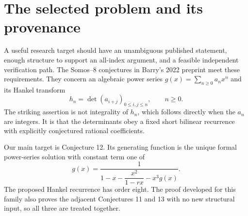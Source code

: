 \documentclass[11pt,letterpaper]{article}
\numberwithin{equation}{section}
\theoremstyle{definition}
\begin{document}
\begin{abstract}
Barry proposed three one-parameter families of algebraic generating functions
whose Hankel transforms were conjectured to satisfy explicit Somos--8
recurrences. We prove the three bilinear assertions, namely the Somos--8
parts of Conjectures 11, 12, and 13 in arXiv:2211.12637. The argument makes a
finite computation logically sufficient: Hone's genus-two Hankel theorem
implies that an infinite matrix of quadratic products has rank at most four;
a binomial translation puts each proposed family into the corresponding
universal moment class; and four symbolic rows determine the recurrence.
A polynomial-specialization argument is essential because the proposed
families lie on a degenerate parameter locus of the usual continued-fraction
coordinates. We give denominator-free formulas, exact nonzero rank witnesses,
and executable integer-polynomial certificates. For the second family we
also derive two Somos--6 specializations, a positive finite coefficient
formula with a tree interpretation, and an all-orders dominant-singularity
expansion of its generating-function coefficients. These asymptotics concern
the moments, not their Hankel determinants.
\end{abstract}

\setcounter{tocdepth}{1}
\tableofcontents
\newpage

\section{The selected problem and its provenance}
\label{sec:provenance}

A useful research target should have an unambiguous published statement, enough
structure to support an all-index argument, and a feasible independent
verification path. The Somos--8 conjectures in Barry's 2022 preprint
\cite{Barry} meet these requirements. They concern an algebraic power series
\(g(x)=\sum_{n\geq0}a_nx^n\) and its Hankel transform
\begin{equation}
 h_n=\det(a_{i+j})_{0\leq i,j\leq n},\qquad n\geq0.
 \label{eq:hankel}
\end{equation}
The striking assertion is not integrality of \(h_n\), which follows directly
when the \(a_n\) are integers. It is that the determinants obey a fixed
short bilinear recurrence with explicitly conjectured rational coefficients.

Our main target is Conjecture 12. Its generating function is the unique formal
power-series solution with constant term one of
\begin{equation}
 g(x)=\frac{1}{1-x-\dfrac{x^2}{1-rx}-x^3g(x)}.
 \label{eq:c12cf}
\end{equation}
The proposed Hankel recurrence has order eight. The proof developed for this
family also proves the adjacent Conjectures 11 and 13 with no new structural
input, so all three are treated together.
\end{document}
